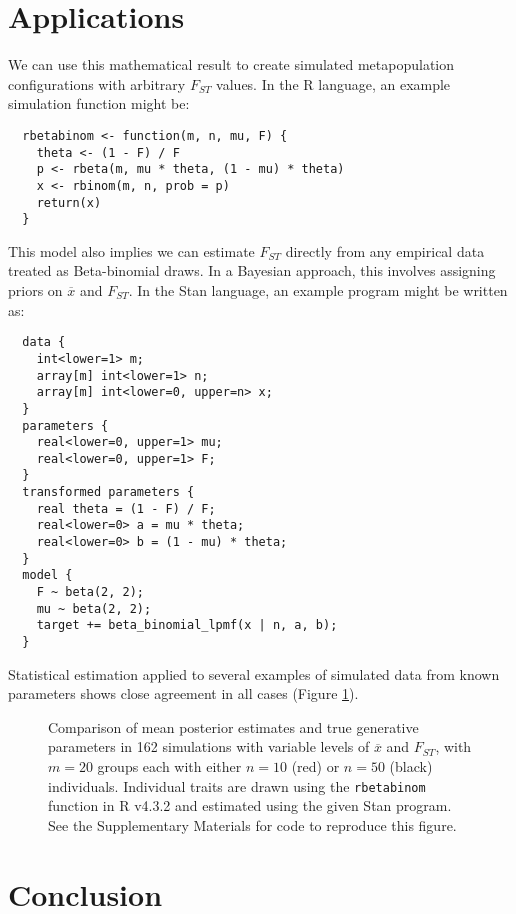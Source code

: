 \documentclass[11pt]{article}
\begin{document}
\newpage 

\section{Applications}

We can use this mathematical result to create simulated metapopulation configurations with arbitrary $F_{ST}$ values. In the R language, an example simulation function might be:

\begin{verbatim}
  rbetabinom <- function(m, n, mu, F) {
    theta <- (1 - F) / F
    p <- rbeta(m, mu * theta, (1 - mu) * theta)
    x <- rbinom(m, n, prob = p)
    return(x)
  }
\end{verbatim}

This model also implies we can estimate $F_{ST}$ directly from any empirical data treated as Beta-binomial draws. In a Bayesian approach, this involves assigning priors on $\overline{x}$ and $F_{ST}$. In the Stan language, an example program might be written as:

\begin{verbatim}
  data {
    int<lower=1> m;
    array[m] int<lower=1> n;
    array[m] int<lower=0, upper=n> x;
  }
  parameters {
    real<lower=0, upper=1> mu;
    real<lower=0, upper=1> F;
  }
  transformed parameters {
    real theta = (1 - F) / F;
    real<lower=0> a = mu * theta;
    real<lower=0> b = (1 - mu) * theta;
  }
  model {
    F ~ beta(2, 2);
    mu ~ beta(2, 2);
    target += beta_binomial_lpmf(x | n, a, b);
  }  
\end{verbatim}

Statistical estimation applied to several examples of simulated data from known parameters shows close agreement in all cases (Figure \ref{fig:simEst}).

\begin{figure}[t]
  \centering
  \resizebox{6in}{!}{%
    
  }
  \caption{Comparison of mean posterior estimates and true generative parameters in 162 simulations with variable levels of $\overline{x}$ and $F_{ST}$, with $m = 20$ groups each with either $n = 10$ (red) or $n = 50$ (black) individuals. Individual traits are drawn using the \texttt{rbetabinom} function in R v4.3.2 and estimated using the given Stan program. See the Supplementary Materials for code to reproduce this figure.}
  \label{fig:simEst}
\end{figure}

\section{Conclusion}
\end{document}
